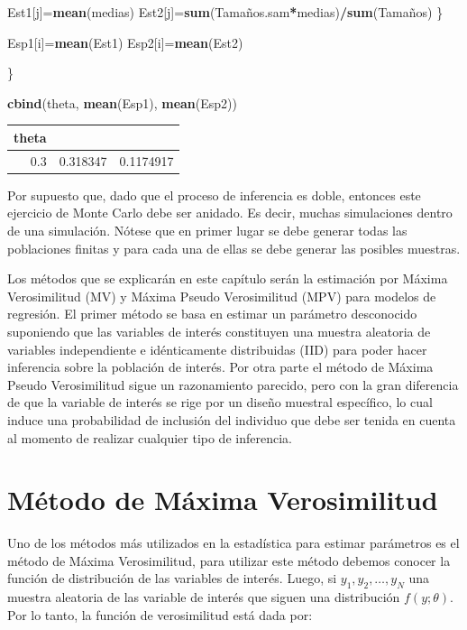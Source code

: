 \documentclass[
  spanish,
  12pt,
]{book}
\newenvironment{Shaded}{\begin{snugshade}}{\end{snugshade}}
\newcommand{\FunctionTok}[1]{\textcolor[rgb]{0.13,0.29,0.53}{\textbf{#1}}}
\newcommand{\NormalTok}[1]{#1}
\newcommand{\OtherTok}[1]{\textcolor[rgb]{0.56,0.35,0.01}{#1}}
\newcommand{\SpecialCharTok}[1]{\textcolor[rgb]{0.81,0.36,0.00}{\textbf{#1}}}
\begin{document}
\begin{Shaded}
\begin{Highlighting}[]
\NormalTok{Est1[j]}\OtherTok{=}\FunctionTok{mean}\NormalTok{(medias)}
\NormalTok{Est2[j]}\OtherTok{=}\FunctionTok{sum}\NormalTok{(Tamaños.sam}\SpecialCharTok{*}\NormalTok{medias)}\SpecialCharTok{/}\FunctionTok{sum}\NormalTok{(Tamaños)}
\NormalTok{\}}

\NormalTok{Esp1[i]}\OtherTok{=}\FunctionTok{mean}\NormalTok{(Est1)}
\NormalTok{Esp2[i]}\OtherTok{=}\FunctionTok{mean}\NormalTok{(Est2)}

\NormalTok{\}}

\FunctionTok{cbind}\NormalTok{(theta, }\FunctionTok{mean}\NormalTok{(Esp1), }\FunctionTok{mean}\NormalTok{(Esp2))}
\end{Highlighting}
\end{Shaded}

\begin{tabular}{r|r|r}
\hline
theta &  & \\
\hline
0.3 & 0.318347 & 0.1174917\\
\hline
\end{tabular}

Por supuesto que, dado que el proceso de inferencia es doble, entonces este ejercicio de Monte Carlo debe ser anidado. Es decir, muchas simulaciones dentro de una simulación. Nótese que en primer lugar se debe generar todas las poblaciones finitas y para cada una de ellas se debe generar las posibles muestras.

Los métodos que se explicarán en este capítulo serán la estimación por Máxima Verosimilitud (MV) y Máxima Pseudo Verosimilitud (MPV) para modelos de regresión. El primer método se basa en estimar un parámetro desconocido suponiendo que las variables de interés constituyen una muestra aleatoria de variables independiente e idénticamente distribuidas (IID) para poder hacer inferencia sobre la población de interés. Por otra parte el método de Máxima Pseudo Verosimilitud sigue un razonamiento parecido, pero con la gran diferencia de que la variable de interés se rige por un diseño muestral específico, lo cual induce una probabilidad de inclusión del individuo que debe ser tenida en cuenta al momento de realizar cualquier tipo de inferencia.

\section{Método de Máxima Verosimilitud}\label{muxe9todo-de-muxe1xima-verosimilitud}

Uno de los métodos más utilizados en la estadística para estimar parámetros es el método de Máxima Verosimilitud, para utilizar este método debemos conocer la función de distribución de las variables de interés. Luego, si \(y_{1},y_{2},\ldots,y_{N}\) una muestra aleatoria de las variable de interés que siguen una distribución \(f(y;\theta)\). Por lo tanto, la función de verosimilitud está dada por:
\end{document}
